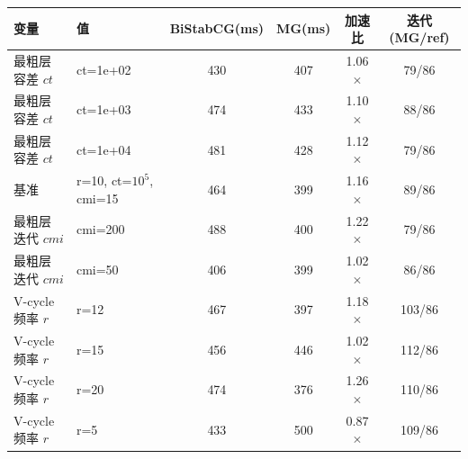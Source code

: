 \begin{longtable}{llcccc}
\toprule
变量 & 值 & BiStabCG(ms) & MG(ms) & 加速比 & 迭代(MG/ref) \\
\midrule
\endhead
最粗层容差 $ct$ & ct=1e+02 & 430 & 407 & 1.06$\times$ & 79/86 \\
最粗层容差 $ct$ & ct=1e+03 & 474 & 433 & 1.10$\times$ & 88/86 \\
最粗层容差 $ct$ & ct=1e+04 & 481 & 428 & 1.12$\times$ & 79/86 \\
基准 & r=10, ct=$10^5$, cmi=15 & 464 & 399 & 1.16$\times$ & 89/86 \\
最粗层迭代 $cmi$ & cmi=200 & 488 & 400 & 1.22$\times$ & 79/86 \\
最粗层迭代 $cmi$ & cmi=50 & 406 & 399 & 1.02$\times$ & 86/86 \\
V-cycle 频率 $r$ & r=12 & 467 & 397 & 1.18$\times$ & 103/86 \\
V-cycle 频率 $r$ & r=15 & 456 & 446 & 1.02$\times$ & 112/86 \\
V-cycle 频率 $r$ & r=20 & 474 & 376 & 1.26$\times$ & 110/86 \\
V-cycle 频率 $r$ & r=5 & 433 & 500 & 0.87$\times$ & 109/86 \\
\bottomrule
\end{longtable}
